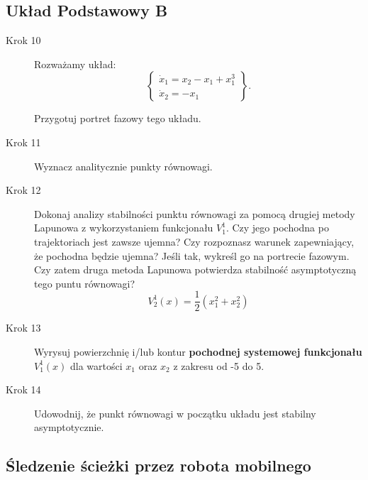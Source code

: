 \documentclass{sprawozdanie-agh}
\begin{document}
    \subsection{Układ Podstawowy B}
            \begin{description}

            \item[Krok 10]         Rozważamy układ:
            \begin{equation}
            \label{eq:zadania_przyklad_2}
                \left\{
                \begin{array}{l}
                    \dot{x}_{1} = x_{2} - x_{1} + x_{1}^{3}\\
                    \dot{x}_{2} = -x_{1}
                \end{array}
                \right\}.
            \end{equation} 
            
            Przygotuj portret fazowy tego układu.

            \item[Krok 11] Wyznacz analitycznie punkty równowagi.

            \item[Krok 12] Dokonaj analizy stabilności punktu równowagi za pomocą drugiej metody Lapunowa z wykorzystaniem funkcjonału $V_{1}^{1}$. Czy jego pochodna po trajektoriach jest zawsze ujemna? Czy rozpoznasz warunek zapewniający, że pochodna będzie ujemna? Jeśli tak, wykreśl go  na portrecie fazowym. Czy zatem druga metoda Lapunowa potwierdza stabilność asymptotyczną tego puntu równowagi?
            \begin{equation*}
                V_{2}^{1}(x) = \frac{1}{2}(x_{1}^{2} + x_{2}^{2})
            \end{equation*}

            \item[Krok 13] Wyrysuj powierzchnię i/lub kontur \textbf{pochodnej systemowej funkcjonału} $V_{1}^{1}(x)$ dla wartości $x_1$ oraz $x_2$ z zakresu od -5 do 5.
            \item[Krok 14] Udowodnij, że punkt równowagi w początku układu jest stabilny asymptotycznie. 
        \end{description}


    \subsection{Śledzenie ścieżki przez robota mobilnego}
    
\end{document}
